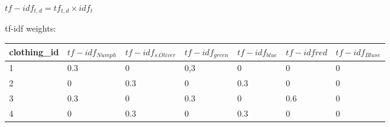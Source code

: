 $tf-idf_{t,d}= tf_{t,d} \times idf_t$

\bigskip
\noindent
tf-idf weights:\\
\begin{tabular}{ l l l l l l l }
    \textbf{clothing\_id}   & \textbf{$tf-idf_{Numph}$} & \textbf{$tf-idf_{s.Oliver}$}   & \textbf{$tf-idf_{green}$}    & \textbf{$tf-idf_{blue}$} & \textbf{$tf-idf{red}$} & \textbf{$tf-idf_{Bluse}$}\\\hline
    1                       & 0.3              & 0                   &  0,3              & 0             & 0            & 0\\
    2                       & 0                & 0.3                 & 0                 & 0.3           & 0            & 0\\
    3                       & 0.3              & 0                   & 0.3               & 0             & 0.6          & 0\\
    4                       & 0                & 0.3                 & 0                 & 0.3           & 0            & 0\\
\end{tabular}










